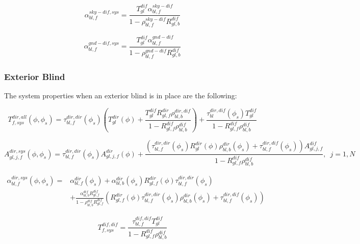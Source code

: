 \begin{equation}
\alpha_{bl,f}^{sky - dif,sys} = \frac{{T_{gl}^{dif}\alpha_{bl,f}^{sky - dif}}}{{1 - \rho_{bl,f}^{sky - dif}R_{gl,b}^{dif}}}
\end{equation}

\begin{equation}
\alpha_{bl,f}^{gnd - dif,sys} = \frac{{T_{gl}^{dif}\alpha_{bl,f}^{gnd - dif}}}{{1 - \rho_{bl,f}^{gnd - dif}R_{gl,b}^{dif}}}
\end{equation}

\subsubsection{Exterior Blind}\label{exterior-blind}

The system properties when an exterior blind is in place are the following:

\begin{equation}
T_{f,sys}^{dir,all}(\phi ,{\phi_s}) = \tau_{bl,f}^{dir,dir}({\phi_s})\left( {T_{gl}^{dir}(\phi ) + \frac{{T_{gl}^{dif}R_{gl,f}^{dir}\rho_{bl,b}^{dir,dif}}}{{1 - R_{gl,f}^{dif}\rho_{bl,b}^{dif}}}} \right) + \frac{{\tau_{bl}^{dir,dif}({\phi_s})T_{gl}^{dif}}}{{1 - R_{gl,f}^{dif}\rho_{bl,b}^{dif}}}
\end{equation}

\begin{equation}
A_{gl,j,f}^{dir,sys}(\phi ,\phi_s) =
     \tau_{bl,f}^{dir,dir}(\phi_s) A_{gl,j,f}^{dir}(\phi ) +
     \frac{
       \left(
         \tau_{bl,f}^{dir,dir}(\phi_s) R_{gl}^{dir}(\phi) \rho_{bl,b}^{dir}(\phi_s)+ \tau_{bl,f}^{dir,dif}(\phi_s)
       \right) A_{gl,j,f}^{dif}
     } {
       1 - R_{gl,f}^{dif}\rho_{bl,b}^{dif}
     },\;~j = 1,N
\end{equation}

\begin{equation}
\begin{split}
\alpha_{bl,f}^{dir,sys}(\phi ,\phi_s) =& \alpha_{bl,f}^{dir}(\phi_s) + \alpha_{bl,b}^{dir}(\phi_s) R_{gl,f}^{dir}(\phi) \tau_{bl,f}^{dir,dir}(\phi_s) \\
&+ \frac{\alpha_{bl,b}^{dif}R_{gl,f}^{dif}}{1 - \rho_{bl,b}^{dif} R_{gl,f}^{dif}}\left(R_{gl,f}^{dir}(\phi) \tau_{bl,f}^{dir,dir}(\phi_s) \rho_{bl,b}^{dir}(\phi_s) + \tau_{bl,f}^{dir,dif}(\phi_s) \right)
\end{split}
\end{equation}

\begin{equation}
T_{f,sys}^{dif,dif} = \frac{{\tau_{bl,f}^{dif,dif}T_{gl}^{dif}}}{{1 - R_{gl,f}^{dif}\rho_{bl,b}^{dif}}}
\end{equation}

